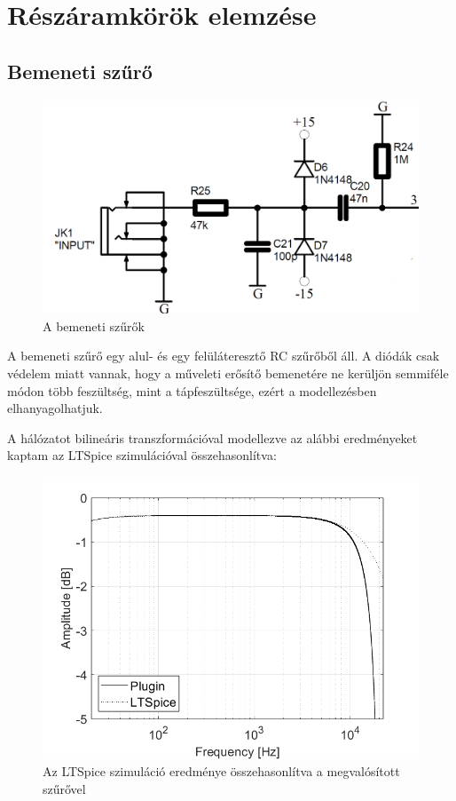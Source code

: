 \section{Részáramkörök elemzése}
\subsection{Bemeneti szűrő}

\begin{figure}[H]
    \centering
    \includegraphics[scale=0.3]{figures/stage1.png}
    \caption{A bemeneti szűrők}
\end{figure}

A bemeneti szűrő egy alul- és egy felüláteresztő RC szűrőből áll. A diódák csak védelem miatt vannak, hogy a 
műveleti erősítő bemenetére ne kerüljön semmiféle módon több feszültség, mint a tápfeszültsége, ezért a 
modellezésben elhanyagolhatjuk.

A hálózatot bilineáris transzformációval modellezve az alábbi eredményeket kaptam az LTSpice szimulációval összehasonlítva:
\begin{figure}[H]
    \centering
    \includegraphics[scale=0.5]{figures/stage1plot.png}
    \caption{Az LTSpice szimuláció eredménye összehasonlítva a megvalósított szűrővel}
\end{figure}

